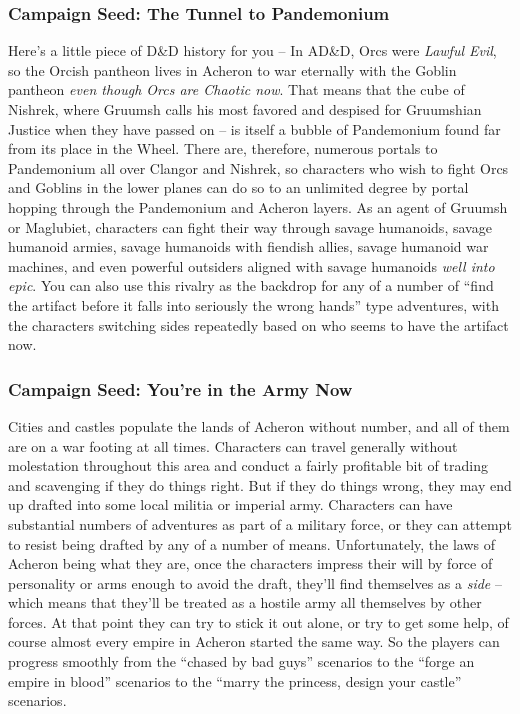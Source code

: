 \subsubsection{Campaign Seed: The Tunnel to Pandemonium}

Here's a little piece of D\&D history for you -- In AD\&D, Orcs were \textit{Lawful Evil}, so the Orcish pantheon lives in Acheron to war eternally with the Goblin pantheon \textit{even though Orcs are Chaotic now}. That means that the cube of Nishrek, where Gruumsh calls his most favored and despised for Gruumshian Justice when they have passed on -- is itself a bubble of Pandemonium found far from its place in the Wheel. There are, therefore, numerous portals to Pandemonium all over Clangor and Nishrek, so characters who wish to fight Orcs and Goblins in the lower planes can do so to an unlimited degree by portal hopping through the Pandemonium and Acheron layers. As an agent of Gruumsh or Maglubiet, characters can fight their way through savage humanoids, savage humanoid armies, savage humanoids with fiendish allies, savage humanoid war machines, and even powerful outsiders aligned with savage humanoids \textit{well into epic}. You can also use this rivalry as the backdrop for any of a number of ``find the artifact before it falls into seriously the wrong hands'' type adventures, with the characters switching sides repeatedly based on who seems to have the artifact now.

\subsubsection{Campaign Seed: You're in the Army Now}

Cities and castles populate the lands of Acheron without number, and all of them are on a war footing at all times. Characters can travel generally without molestation throughout this area and conduct a fairly profitable bit of trading and scavenging if they do things right. But if they do things wrong, they may end up drafted into some local militia or imperial army. Characters can have substantial numbers of adventures as part of a military force, or they can attempt to resist being drafted by any of a number of means. Unfortunately, the laws of Acheron being what they are, once the characters impress their will by force of personality or arms enough to avoid the draft, they'll find themselves as a \textit{side} -- which means that they'll be treated as a hostile army all themselves by other forces. At that point they can try to stick it out alone, or try to get some help, of course almost every empire in Acheron started the same way. So the players can progress smoothly from the ``chased by bad guys'' scenarios to the ``forge an empire in blood'' scenarios to the ``marry the princess, design your castle'' scenarios.

